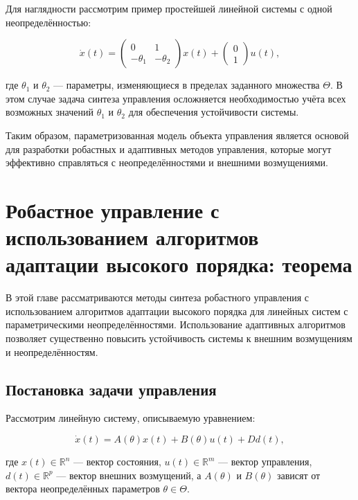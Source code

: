\documentclass[a4paper,14pt]{extarticle} %
\begin{document}
Для наглядности рассмотрим пример простейшей линейной системы с одной неопределённостью:

\begin{equation}
    \dot{x}(t) = \begin{pmatrix}
        0 & 1 \\
        -\theta_1 & -\theta_2
    \end{pmatrix} x(t) + \begin{pmatrix}
        0 \\
        1
    \end{pmatrix} u(t),
\end{equation}

где \( \theta_1 \) и \( \theta_2 \) — параметры, изменяющиеся в пределах заданного множества \( \Theta \). В этом случае задача синтеза управления осложняется необходимостью учёта всех возможных значений \( \theta_1 \) и \( \theta_2 \) для обеспечения устойчивости системы.

Таким образом, параметризованная модель объекта управления является основой для разработки робастных и адаптивных методов управления, которые могут эффективно справляться с неопределённостями и внешними возмущениями.


\newpage
\section{Робастное управление с использованием алгоритмов адаптации высокого порядка: теорема}

В этой главе рассматриваются методы синтеза робастного управления с использованием алгоритмов адаптации высокого порядка для линейных систем с параметрическими неопределённостями. Использование адаптивных алгоритмов позволяет существенно повысить устойчивость системы к внешним возмущениям и неопределённостям.

\subsection*{Постановка задачи управления}

Рассмотрим линейную систему, описываемую уравнением:

\begin{equation}
    \dot{x}(t) = A(\theta)x(t) + B(\theta)u(t) + Dd(t),
\end{equation}

где \( x(t) \in \mathbb{R}^n \) — вектор состояния, \( u(t) \in \mathbb{R}^m \) — вектор управления, \( d(t) \in \mathbb{R}^p \) — вектор внешних возмущений, а \( A(\theta) \) и \( B(\theta) \) зависят от вектора неопределённых параметров \( \theta \in \Theta \).
\end{document}
